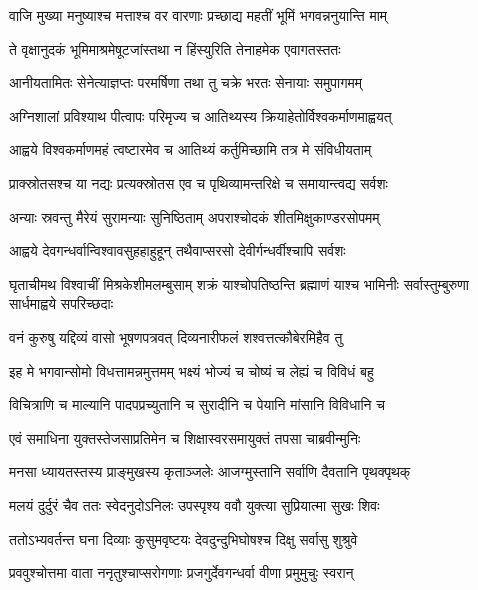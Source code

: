 \twolineshloka
{वाजि मुख्या मनुष्याश्च मत्ताश्च वर वारणाः}
{प्रच्छाद्य महतीं भूमिं भगवन्ननुयान्ति माम्} %

\twolineshloka
{ते वृक्षानुदकं भूमिमाश्रमेषूटजांस्तथा}
{न हिंस्युरिति तेनाहमेक एवागतस्ततः} %

\twolineshloka
{आनीयतामितः सेनेत्याज्ञप्तः परमर्षिणा}
{तथा तु चक्रे भरतः सेनायाः समुपागमम्} %

\twolineshloka
{अग्निशालां प्रविश्याथ पीत्वापः परिमृज्य च}
{आतिथ्यस्य क्रियाहेतोर्विश्वकर्माणमाह्वयत्} %

\twolineshloka
{आह्वये विश्वकर्माणमहं त्वष्टारमेव च}
{आतिथ्यं कर्तुमिच्छामि तत्र मे संविधीयताम्} %

\twolineshloka
{प्राक्स्रोतसश्च या नद्यः प्रत्यक्स्रोतस एव च}
{पृथिव्यामन्तरिक्षे च समायान्त्वद्य सर्वशः} %

\twolineshloka
{अन्याः स्रवन्तु मैरेयं सुरामन्याः सुनिष्ठिताम्}
{अपराश्चोदकं शीतमिक्षुकाण्डरसोपमम्} %

\twolineshloka
{आह्वये देवगन्धर्वान्विश्वावसुहहाहुहून्}
{तथैवाप्सरसो देवीर्गन्धर्वीश्चापि सर्वशः} %

\threelineshloka
{घृताचीमथ विश्वाचीं मिश्रकेशीमलम्बुसाम्}
{शक्रं याश्चोपतिष्ठन्ति ब्रह्माणं याश्च भामिनीः}
{सर्वास्तुम्बुरुणा सार्धमाह्वये सपरिच्छदाः} %

\twolineshloka
{वनं कुरुषु यद्दिव्यं वासो भूषणपत्रवत्}
{दिव्यनारीफलं शश्वत्तत्कौबेरमिहैव तु} %

\twolineshloka
{इह मे भगवान्सोमो विधत्तामन्नमुत्तमम्}
{भक्ष्यं भोज्यं च चोष्यं च लेह्यं च विविधं बहु} %

\twolineshloka
{विचित्राणि च माल्यानि पादपप्रच्युतानि च}
{सुरादीनि च पेयानि मांसानि विविधानि च} %

\twolineshloka
{एवं समाधिना युक्तस्तेजसाप्रतिमेन च}
{शिक्षास्वरसमायुक्तं तपसा चाब्रवीन्मुनिः} %

\twolineshloka
{मनसा ध्यायतस्तस्य प्राङ्मुखस्य कृताञ्जलेः}
{आजग्मुस्तानि सर्वाणि दैवतानि पृथक्पृथक्} %

\twolineshloka
{मलयं दुर्दुरं चैव ततः स्वेदनुदोऽनिलः}
{उपस्पृश्य ववौ युक्त्या सुप्रियात्मा सुखः शिवः} %

\twolineshloka
{ततोऽभ्यवर्तन्त घना दिव्याः कुसुमवृष्टयः}
{देवदुन्दुभिघोषश्च दिक्षु सर्वासु शुश्रुवे} %

\twolineshloka
{प्रववुश्चोत्तमा वाता ननृतुश्चाप्सरोगणाः}
{प्रजगुर्देवगन्धर्वा वीणा प्रमुमुचुः स्वरान्} %

